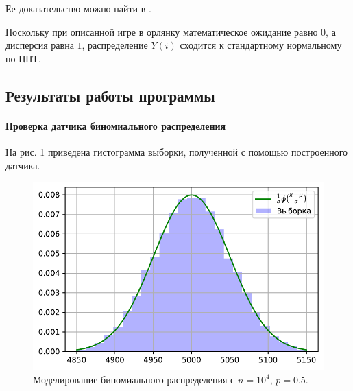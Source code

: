 \documentclass[16pt]{article}
\begin{document}
Ее доказательство можно найти в \cite{Shir}.

Поскольку при описанной игре в орлянку математическое ожидание равно $0$, а дисперсия равна $1$, распределение $Y(i)$ сходится к стандартному нормальному по ЦПТ. 

\subsection{Результаты работы программы}

\paragraph{Проверка датчика биномиального распределения} На рис. 1 приведена гистограмма выборки, полученной с помощью построенного датчика.
\begin{figure}[h]
	\center
    \includegraphics[scale=0.7]{1_1.pdf}
    \caption{Моделирование биномиального распределения с $n = 10^4,\, p = 0.5$.}
\end{figure}
\end{document}
